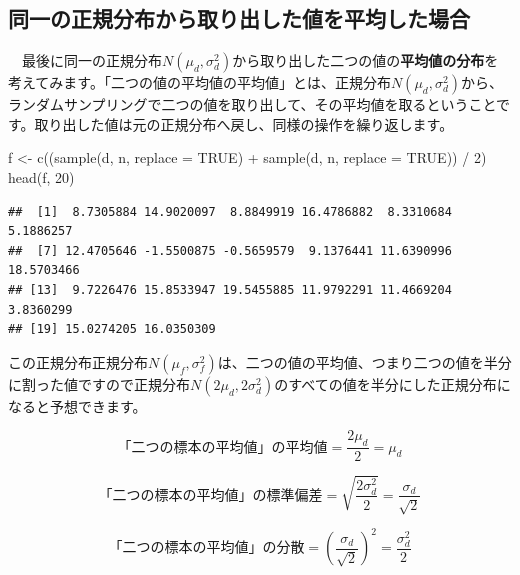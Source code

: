 \documentclass[]{tufte-handout}
\newenvironment{Shaded}{}{}
\newcommand{\AttributeTok}[1]{\textcolor[rgb]{0.49,0.56,0.16}{#1}}
\newcommand{\ConstantTok}[1]{\textcolor[rgb]{0.53,0.00,0.00}{#1}}
\newcommand{\DecValTok}[1]{\textcolor[rgb]{0.25,0.63,0.44}{#1}}
\newcommand{\FunctionTok}[1]{\textcolor[rgb]{0.02,0.16,0.49}{#1}}
\newcommand{\NormalTok}[1]{#1}
\newcommand{\OtherTok}[1]{\textcolor[rgb]{0.00,0.44,0.13}{#1}}
\newcommand{\SpecialCharTok}[1]{\textcolor[rgb]{0.25,0.44,0.63}{#1}}
\begin{document}
\newpage

\hypertarget{ux540cux4e00ux306eux6b63ux898fux5206ux5e03ux304bux3089ux53d6ux308aux51faux3057ux305fux5024ux3092ux5e73ux5747ux3057ux305fux5834ux5408}{%
\subsection{\texorpdfstring{\textbf{同一の正規分布から取り出した値を平均した場合}}{同一の正規分布から取り出した値を平均した場合}}\label{ux540cux4e00ux306eux6b63ux898fux5206ux5e03ux304bux3089ux53d6ux308aux51faux3057ux305fux5024ux3092ux5e73ux5747ux3057ux305fux5834ux5408}}

　最後に同一の正規分布\(N(\mu_d, \sigma^2_d)\)から取り出した二つの値の\textbf{平均値の分布}を考えてみます。「二つの値の平均値の平均値」とは、正規分布\(N(\mu_d, \sigma^2_d)\)から、ランダムサンプリングで二つの値を取り出して、その平均値を取るということです。取り出した値は元の正規分布へ戻し、同様の操作を繰り返します。

\begin{Shaded}
\begin{Highlighting}[numbers=left,,]
\NormalTok{f }\OtherTok{\textless{}{-}} \FunctionTok{c}\NormalTok{((}\FunctionTok{sample}\NormalTok{(d, n, }\AttributeTok{replace =} \ConstantTok{TRUE}\NormalTok{) }\SpecialCharTok{+} \FunctionTok{sample}\NormalTok{(d, n, }\AttributeTok{replace =} \ConstantTok{TRUE}\NormalTok{)) }\SpecialCharTok{/} \DecValTok{2}\NormalTok{)}
\FunctionTok{head}\NormalTok{(f, }\DecValTok{20}\NormalTok{)}
\end{Highlighting}
\end{Shaded}

\begin{verbatim}
##  [1]  8.7305884 14.9020097  8.8849919 16.4786882  8.3310684  5.1886257
##  [7] 12.4705646 -1.5500875 -0.5659579  9.1376441 11.6390996 18.5703466
## [13]  9.7226476 15.8533947 19.5455885 11.9792291 11.4669204  3.8360299
## [19] 15.0274205 16.0350309
\end{verbatim}

この正規分布正規分布\(N(\mu_f, \sigma^2_f)\)は、二つの値の平均値、つまり二つの値を半分に割った値ですので正規分布\(N(2\mu_d, 2\sigma^2_d)\)のすべての値を半分にした正規分布になると予想できます。

\[\mbox{「二つの標本の平均値」の平均値} = \frac{2\mu_d}{2} = \mu_d\]

\[\mbox{「二つの標本の平均値」の標準偏差} = \sqrt{\frac{2\sigma^2_d}{2}} = \frac{\sigma_d}{\sqrt{2}}\]

\[\mbox{「二つの標本の平均値」の分散} = (\frac{\sigma_d}{\sqrt{2}})^2 = \frac{\sigma^2_d}{2}\]
\end{document}
